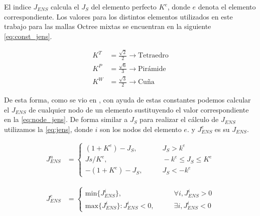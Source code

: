 El indice $J_{ENS}$ calcula el $J_S$ del elemento perfecto $K^e$, donde $e$ denota el elemento correspondiente. Los valores para los distintos elementos utilizados en este trabajo para las mallas Octree mixtas se encuentran en la siguiente \autoref{eq:const_jens}.


\begin{equation} \label{eq:const_jens}
    \begin{aligned}
    K^T &= \frac{\sqrt{2}}{2} \longrightarrow \text{Tetraedro} \\
    K^P &= \frac{\sqrt{6}}{3} \longrightarrow \text{Pirámide} \\
    K^W &= \frac{\sqrt{3}}{2} \longrightarrow \text{Cuña}
    \end{aligned}
\end{equation}

De esta forma, como se vio en \cite{daines2018repairing}, con ayuda de estas constantes podemos calcular el $J_{ENS}$ de cualquier nodo de un elemento sustituyendo el valor correspondiente en la \autoref{eq:node_jens}. De forma similar a $J_S$ para realizar el cálculo de $J_{ENS}$ utilizamos la \autoref{eq:jens}, donde $i$ son los nodos del elemento $e$. y $J^e_{ENS}$ es su $J_{ENS}$.

\begin{equation} \label{eq:node_jens}
    \begin{aligned}
J^n_{ENS} &=    
\left\{
\begin{array}{rl}
     ( 1 + K^e ) - J_S, & \qquad J_S > k^e
  \\ Js/K^e, & \qquad -k^e \leq J_S \leq K^e
  \\ -( 1 + K^e ) - J_S, & \qquad J_S < -k^e
\end{array}
\right.
    \end{aligned}
\end{equation}


\begin{equation} \label{eq:jens}
    \begin{aligned}
J^e_{ENS} &=    
\left\{
\begin{array}{ll}
     \text{min}\{J^i_{ENS}\}, & \qquad \forall i, J^i_{ENS} > 0
  \\ \text{max}\{J^i_{ENS}\} : J^i_{ENS} < 0, & \qquad \exists i, J^i_{ENS} < 0
\end{array}
\right.
    \end{aligned}
\end{equation}



